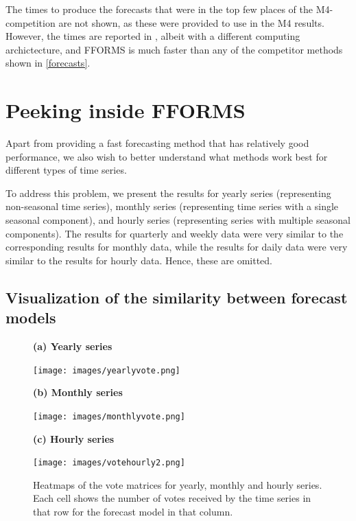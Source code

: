 \documentclass[11pt,a4paper,]{article}
\begin{document}
The times to produce the forecasts that were in the top few places of the M4-competition are not shown, as these were provided to use in the M4 results. However, the times are reported in \textcite{makridakis2019m4}, albeit with a different computing archictecture,
and FFORMS is much faster than any of the competitor methods shown in \autoref{forecasts}.

\hypertarget{peeking}{%
\section{Peeking inside FFORMS}\label{peeking}}

Apart from providing a fast forecasting method that has relatively good performance, we also wish to better understand what methods work best for different types of time series.

To address this problem, we present the results for yearly series (representing non-seasonal time series), monthly series (representing time series with a single seasonal component), and hourly series (representing series with multiple seasonal components). The results for quarterly and weekly data were very similar to the corresponding results for monthly data, while the results for daily data were very similar to the results for hourly data. Hence, these are omitted.

\hypertarget{oobviz}{%
\subsection{Visualization of the similarity between forecast models}\label{oobviz}}

\begin{figure}[p]

\textbf{(a) Yearly series}\par
\centerline{\texttt{[image: images/yearlyvote.png]}}

\textbf{(b) Monthly series}\par
\centerline{\texttt{[image: images/monthlyvote.png]}}

\textbf{(c) Hourly series}\par
\centerline{\texttt{[image: images/votehourly2.png]}}

\caption{Heatmaps of the vote matrices for yearly, monthly and hourly series. Each cell shows the number of votes received by the time series in that row for the forecast model in that column.}\label{fig:heatmaps}
\end{figure}
\end{document}

